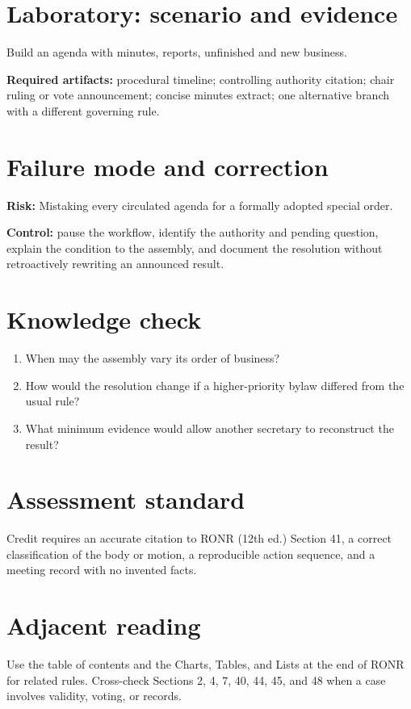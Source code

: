 \documentclass[11pt]{article}
\begin{document}
\section{Laboratory: scenario and evidence}
Build an agenda with minutes, reports, unfinished and new business.

\textbf{Required artifacts:} procedural timeline; controlling authority citation; chair ruling or vote announcement; concise minutes extract; one alternative branch with a different governing rule.

\section{Failure mode and correction}
\textbf{Risk:} Mistaking every circulated agenda for a formally adopted special order.

\textbf{Control:} pause the workflow, identify the authority and pending question, explain the condition to the assembly, and document the resolution without retroactively rewriting an announced result.

\section{Knowledge check}
\begin{enumerate}[leftmargin=*,itemsep=4pt]
\item When may the assembly vary its order of business?
\item How would the resolution change if a higher-priority bylaw differed from the usual rule?
\item What minimum evidence would allow another secretary to reconstruct the result?
\end{enumerate}

\section{Assessment standard}
Credit requires an accurate citation to RONR (12th ed.) Section 41, a correct classification of the body or motion, a reproducible action sequence, and a meeting record with no invented facts.

\section{Adjacent reading}
Use the table of contents and the Charts, Tables, and Lists at the end of RONR for related rules. Cross-check Sections 2, 4, 7, 40, 44, 45, and 48 when a case involves validity, voting, or records.
\end{document}
